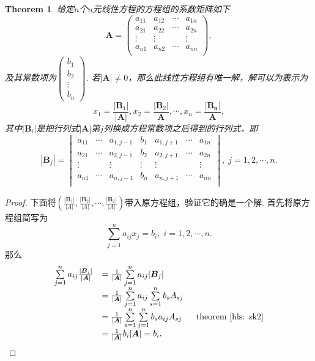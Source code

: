 \documentclass{article}
\newtheorem{theorem}{Theorem}[section]
\newcommand{\mbf}[1]{\bm{#1}}
\begin{document}
\begin{theorem}
\rm 给定$n$个$n$元线性方程的方程组的系数矩阵如下
$$
\mbf{A}=
\begin{pmatrix}
a_{11} & a_{12} & \cdots & a_{1n} \\
a_{21} & a_{22} & \cdots & a_{2n} \\
\vdots & \vdots & 		 & \vdots \\
a_{n1} & a_{n2} & \cdots & a_{nn} \\
\end{pmatrix},
$$
及其常数项为$\begin{pmatrix}b_1 \\ b_2 \\ \vdots \\b_n \end{pmatrix}$. 若$|\mbf{A}| \neq 0$，那么此线性方程组有唯一解，解可以为表示为
$$
x_1 = \frac{|\mbf{B}_1|}{|\mbf{A}|},x_2 = \frac{|\mbf{B}_2|}{\mbf{A}},\cdots, x_n = \frac{|\mbf{B_n}|}{\mbf{A}},
$$
其中$|\mbf{B}_i|$是把行列式$|\mbf{A}|$第$j$列换成方程常数项之后得到的行列式，即
$$
|\mbf{B}_j| = 
\begin{vmatrix}
a_{11} & \cdots & a_{1,j-1}  & b_1 & a_{1,j+1} & \cdots & a_{1n} \\
a_{21} & \cdots & a_{2,j-1}  & b_2 & a_{2,j+1} & \cdots & a_{2n} \\
\vdots &  & \vdots & \vdots &  \vdots & & \vdots \\
a_{n1} & \cdots & a_{n,j-1}  & b_n & a_{n,j+1} & \cdots & a_{nn} \\
\end{vmatrix},\; j=1,2,\cdots,n.
$$

\end{theorem}


\begin{proof}
下面将$(\frac{|\mbf{B}_1|}{|A|},\frac{|\mbf{B}_2|}{|A|},\cdots,\frac{|\mbf{B}_2|}{|A|})$带入原方程组，验证它的确是一个解. 首先将原方程组简写为
$$
\sum\limits_{j=1}^n a_{ij}x_j = b_i , \; i = 1,2,\cdots,n.
$$
那么
$$
\begin{array}{ll}
\sum\limits_{j=1}^n a_{ij}\frac{|\mbf{B}_j|}{|\mbf{A}|} &= \frac{1}{|\mbf{A}|}\sum\limits_{j=1}^n a_{ij}|\mbf{B}_j| \\
&= \frac{1}{|\mbf{A}|}\sum\limits_{j=1}^n a_{ij}\sum\limits_{s=1}^n b_sA_{sj} \\
&= \frac{1}{|\mbf{A}|}\sum\limits_{s=1}^n\sum\limits_{j=1}^n b_sa_{ij}A_{sj} ~  ~ ~ ~ ~\text{theorem \ref{hls: zk2}}\\ 
&= \frac{1}{|\mbf{A}|} b_i |\mbf{A}| = b_i.
\end{array}
$$
\end{proof}
\end{document}
